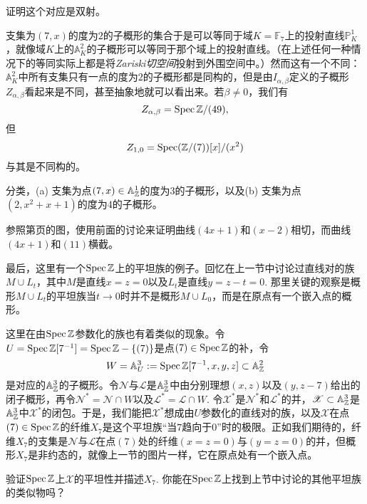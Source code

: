 \begin{exe}
证明这个对应是双射。
\end{exe}

支集为$(7,x)$的度为$2$的子概形的集合于是可以等同于域$K=\mathbb{F}_7$上的投射直线$\mathbb{P}_K^1$，就像域$K$上的$\mathbb{A}_K^2$的子概形可以等同于那个域上的投射直线。（在上述任何一种情况下的等同实际上都是将\textit{Zariski切空间}投射到外围空间中。\nottran）然而这有一个不同：$\mathbb{A}_K^2$中所有支集只有一点的度为$2$的子概形都是同构的，但是由$I_{\alpha,\beta}$定义的子概形$Z_{\alpha,\beta}$看起来是不同，甚至抽象地就可以看出来。若$\beta\neq 0$，我们有
\[
	Z_{\alpha,\beta}=\operatorname{Spec} \mathbb{Z}/(49),
\]
但
\[
	Z_{1,0}=\operatorname{Spec}(\mathbb{Z}/(7))[x]/(x^2)
\]
与其是不同构的。

\begin{exe}
分类，(a) 支集为点$(7,x)\in\mathbb{A}_{\mathbb{Z}}^1$的度为$3$的子概形，以及(b) 支集为点$(2,x^2+x+1)$的度为$4$的子概形。
\end{exe}

\begin{exe}\label{exe:2.44}
参照第\pageref{p:2.18}页的图，使用前面的讨论来证明曲线$(4x + 1)$和$(x-2)$相切，而曲线$(4x + 1)$和$(11)$横截。
\end{exe}

最后，这里有一个$\operatorname{Spec} \mathbb{Z}$上的平坦族的例子。回忆在上一节中讨论过直线对的族$M\cup L_t$，其中$M$是直线$x=z=0$以及$L_t$是直线$y=z-t=0$. 那里关键的观察是概形$M\cup L_t$的平坦族当$t\to 0$时并不是概形$M\cup L_0$，而是在原点有一个嵌入点的概形。

这里在由$\operatorname{Spec} \mathbb{Z}$参数化的族也有着类似的现象。令$U=\operatorname{Spec} \mathbb{Z}[7^{-1}]=\operatorname{Spec} \mathbb{Z}-\{(7)\}$是点$(7)\in\operatorname{Spec}\mathbb{Z}$的补，令
\[
	W=\mathbb{A}_U^3:=\operatorname{Spec} \mathbb{Z}[7^{-1},x,y,z]\subset \mathbb{A}_{\mathbb{Z}}^2
\]
是对应的$\mathbb{A}_{\mathbb{Z}}^3$的子概形。令$\mathscr{N}$与$\mathscr{L}$是$\mathbb{A}_{\mathbb{Z}}^3$中由分别理想$(x,z)$以及$(y,z-7)$给出的闭子概形，再令$\mathscr{N}^*=\mathscr{N}\cap W$以及$\mathscr{L}^*=\mathscr{L}\cap W$. 令$\mathscr{X}^*$是$\mathscr{N}^*$和$\mathscr{L}^*$的并，$\mathscr{X}\subset \mathbb{A}_{\mathbb{Z}}^3$是$\mathbb{A}_{\mathbb{Z}}^3$中$\mathscr{X}^*$的闭包。于是，我们能把$\mathscr{X}^*$想成由$U$参数化的直线对的族，以及$\mathscr{X}$在点$(7)\in\operatorname{Spec} \mathbb{Z}$的纤维$X_7$是这个平坦族“当$7$趋向于$0$”时的极限。正如我们期待的，纤维$X_7$的支集是$\mathscr{N}$与$\mathscr{L}$在点$(7)$处的纤维$(x=z=0)$与$(y=z=0)$的并，但概形$X_7$是非约态的，就像上一节的图片一样，它在原点处有一个嵌入点。

\begin{exe}
验证$\operatorname{Spec}\mathbb{Z}$上$\mathscr{X}$的平坦性并描述$X_7$. 你能在$\operatorname{Spec}\mathbb{Z}$上找到上节中讨论的其他平坦族的类似物吗？
\end{exe}